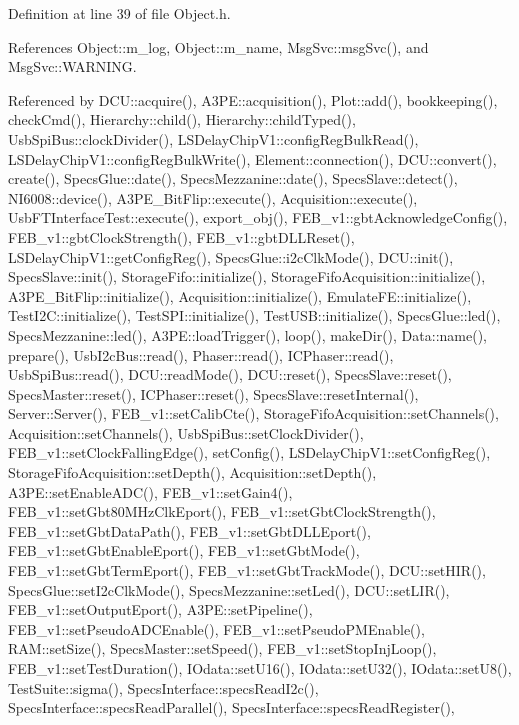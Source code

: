 Definition at line 39 of file Object.\+h.



References Object\+::m\+\_\+log, Object\+::m\+\_\+name, Msg\+Svc\+::msg\+Svc(), and Msg\+Svc\+::\+W\+A\+R\+N\+I\+NG.



Referenced by D\+C\+U\+::acquire(), A3\+P\+E\+::acquisition(), Plot\+::add(), bookkeeping(), check\+Cmd(), Hierarchy\+::child(), Hierarchy\+::child\+Typed(), Usb\+Spi\+Bus\+::clock\+Divider(), L\+S\+Delay\+Chip\+V1\+::config\+Reg\+Bulk\+Read(), L\+S\+Delay\+Chip\+V1\+::config\+Reg\+Bulk\+Write(), Element\+::connection(), D\+C\+U\+::convert(), create(), Specs\+Glue\+::date(), Specs\+Mezzanine\+::date(), Specs\+Slave\+::detect(), N\+I6008\+::device(), A3\+P\+E\+\_\+\+Bit\+Flip\+::execute(), Acquisition\+::execute(), Usb\+F\+T\+Interface\+Test\+::execute(), export\+\_\+obj(), F\+E\+B\+\_\+v1\+::gbt\+Acknowledge\+Config(), F\+E\+B\+\_\+v1\+::gbt\+Clock\+Strength(), F\+E\+B\+\_\+v1\+::gbt\+D\+L\+L\+Reset(), L\+S\+Delay\+Chip\+V1\+::get\+Config\+Reg(), Specs\+Glue\+::i2c\+Clk\+Mode(), D\+C\+U\+::init(), Specs\+Slave\+::init(), Storage\+Fifo\+::initialize(), Storage\+Fifo\+Acquisition\+::initialize(), A3\+P\+E\+\_\+\+Bit\+Flip\+::initialize(), Acquisition\+::initialize(), Emulate\+F\+E\+::initialize(), Test\+I2\+C\+::initialize(), Test\+S\+P\+I\+::initialize(), Test\+U\+S\+B\+::initialize(), Specs\+Glue\+::led(), Specs\+Mezzanine\+::led(), A3\+P\+E\+::load\+Trigger(), loop(), make\+Dir(), Data\+::name(), prepare(), Usb\+I2c\+Bus\+::read(), Phaser\+::read(), I\+C\+Phaser\+::read(), Usb\+Spi\+Bus\+::read(), D\+C\+U\+::read\+Mode(), D\+C\+U\+::reset(), Specs\+Slave\+::reset(), Specs\+Master\+::reset(), I\+C\+Phaser\+::reset(), Specs\+Slave\+::reset\+Internal(), Server\+::\+Server(), F\+E\+B\+\_\+v1\+::set\+Calib\+Cte(), Storage\+Fifo\+Acquisition\+::set\+Channels(), Acquisition\+::set\+Channels(), Usb\+Spi\+Bus\+::set\+Clock\+Divider(), F\+E\+B\+\_\+v1\+::set\+Clock\+Falling\+Edge(), set\+Config(), L\+S\+Delay\+Chip\+V1\+::set\+Config\+Reg(), Storage\+Fifo\+Acquisition\+::set\+Depth(), Acquisition\+::set\+Depth(), A3\+P\+E\+::set\+Enable\+A\+D\+C(), F\+E\+B\+\_\+v1\+::set\+Gain4(), F\+E\+B\+\_\+v1\+::set\+Gbt80\+M\+Hz\+Clk\+Eport(), F\+E\+B\+\_\+v1\+::set\+Gbt\+Clock\+Strength(), F\+E\+B\+\_\+v1\+::set\+Gbt\+Data\+Path(), F\+E\+B\+\_\+v1\+::set\+Gbt\+D\+L\+L\+Eport(), F\+E\+B\+\_\+v1\+::set\+Gbt\+Enable\+Eport(), F\+E\+B\+\_\+v1\+::set\+Gbt\+Mode(), F\+E\+B\+\_\+v1\+::set\+Gbt\+Term\+Eport(), F\+E\+B\+\_\+v1\+::set\+Gbt\+Track\+Mode(), D\+C\+U\+::set\+H\+I\+R(), Specs\+Glue\+::set\+I2c\+Clk\+Mode(), Specs\+Mezzanine\+::set\+Led(), D\+C\+U\+::set\+L\+I\+R(), F\+E\+B\+\_\+v1\+::set\+Output\+Eport(), A3\+P\+E\+::set\+Pipeline(), F\+E\+B\+\_\+v1\+::set\+Pseudo\+A\+D\+C\+Enable(), F\+E\+B\+\_\+v1\+::set\+Pseudo\+P\+M\+Enable(), R\+A\+M\+::set\+Size(), Specs\+Master\+::set\+Speed(), F\+E\+B\+\_\+v1\+::set\+Stop\+Inj\+Loop(), F\+E\+B\+\_\+v1\+::set\+Test\+Duration(), I\+Odata\+::set\+U16(), I\+Odata\+::set\+U32(), I\+Odata\+::set\+U8(), Test\+Suite\+::sigma(), Specs\+Interface\+::specs\+Read\+I2c(), Specs\+Interface\+::specs\+Read\+Parallel(), Specs\+Interface\+::specs\+Read\+Register(), 